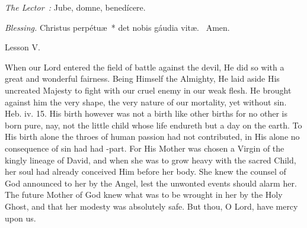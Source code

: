 {{    \emph{The Lector~:} Jube, domne, benedícere.

    \emph{Blessing.} Christus perpétuæ~* det nobis gáudia vitæ. \Rbar{}~Amen.
  }

  \bigskip{}
  {
    \hfil{Lesson V.}\hfil

    \begin{parcolumns}[rulebetween,colwidths={1=.45\linewidth}]{2}
    {When our Lord entered the field of battle against the devil, He did so with a great and wonderful fairness. Being Himself the Almighty, He laid aside His uncreated Majesty to fight with our cruel enemy in our weak flesh. He brought against him the very shape, the very nature of our mortality, yet without sin. Heb. iv. 15. His birth however was not a birth like other births for no other is born pure, nay, not the little child whose life endureth but a day on the earth. To His birth alone the throes of human passion had not contributed, in His alone no consequence of sin had had -part. For His Mother was chosen a Virgin of the kingly lineage of David, and when she was to grow heavy with the sacred Child, her soul had already conceived Him before her body. She knew the counsel of God announced to her by the Angel, lest the unwonted events should alarm her. The future Mother of God knew what was to be wrought in her by the Holy Ghost, and that her modesty was absolutely safe.
      But thou, O Lord, have mercy upon us.}
    \end{parcolumns}

  }

  {
    \bigskip
    \medskip

}}
